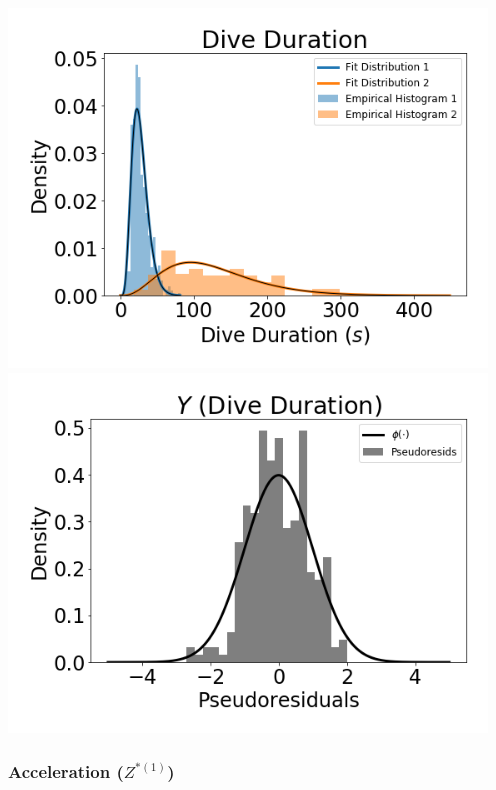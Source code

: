 \documentclass[12pt]{TD-CJS}
\begin{document}
\includegraphics[width=5in]{../Plots/empirical_hist_dive_duration.png}
\includegraphics[width=5in]{../Plots/psedoresids_Dive_Duration.png}

\newpage
\subsubsection{Acceleration ($Z^{*(1)}$)}
\end{document}
